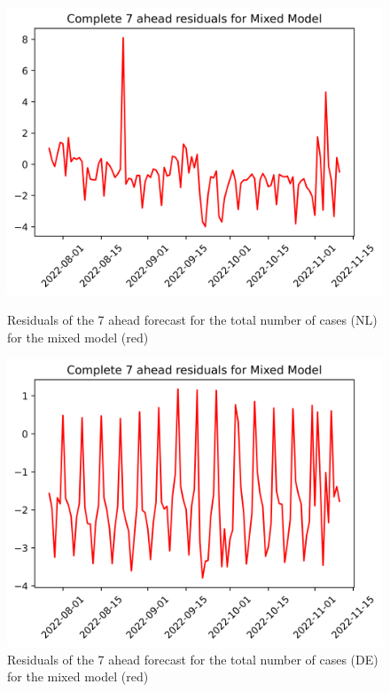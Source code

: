 \begin{figure}

\begin{minipage}{.32\textwidth}
  \centering
  \includegraphics[width=\linewidth]{pics/7_ah/7_ahead_errors_Mixed Model.png}
  \caption{Residuals of the 7 ahead forecast for the total number of cases (NL) for the mixed model (red)}
  \label{fig:tot_cases_error_7_mix}
\end{minipage}
\begin{minipage}{.32\textwidth}
  \centering
  \includegraphics[width=\linewidth]{pics/7_ah/DE_7_ahead_errors_Mixed Model.png}
  \caption{Residuals of the 7 ahead forecast for the total number of cases (DE) for the mixed model (red)}

\end{minipage}
\end{figure}
